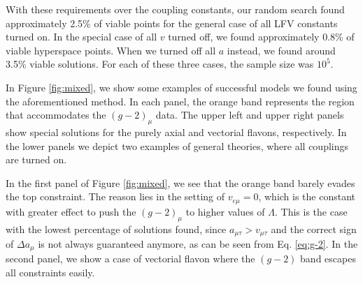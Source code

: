 \documentclass[prd,amsfonts,onecolumn,superscriptaddress,aps,nofootinbib,11pt]{revtex4-1}
\begin{document}
With these requirements over the coupling constants, our random search found approximately 2.5\% of viable points for the general case of all LFV constants turned on. In the special case of all $v$ turned off, we found approximately 0.8\% of viable hyperspace points. When we turned off all $a$ instead, we found around 3.5\% viable solutions. For each of these three cases, the sample size was $10^5$.



In Figure \ref{fig:mixed}, we show some examples of successful models we found using the aforementioned method. In each panel, the orange band represents the region that accommodates the $(g-2)_\mu$ data. The upper left and upper right panels show special solutions for the purely axial and vectorial flavons, respectively. In the lower panels we depict two examples of general theories, where all couplings are turned on.

In the first panel of Figure \ref{fig:mixed}, we see that the orange band barely evades the top constraint. The reason lies in the setting of $v_{e \mu} = 0$, which is the constant with greater effect to push the $(g-2)_\mu$ to higher values of $\Lambda$. This is the case with the lowest percentage of solutions found, since $a_{\mu \tau} > v_{\mu \tau}$ and the correct sign of $\Delta a_\mu$ is not always guaranteed anymore, as can be seen from Eq. \eqref{eq:g-2}. In the second panel, we show a case of vectorial flavon where the $(g-2)$ band escapes all constraints easily.


\end{document}
